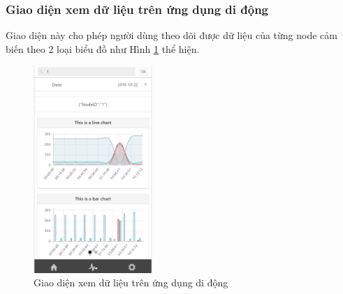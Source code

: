 \subsubsection*{Giao diện xem dữ liệu trên ứng dụng di động}
Giao diện này cho phép người dùng theo dõi được dữ liệu của từng node cảm biến theo 2 loại biểu đồ như Hình \ref{fig:app_graph} thể hiện.
\begin{center}
\begin{figure}[H]
\centering    
\includegraphics[width=0.4\textwidth]{app_graph}
\caption[Giao diện xem dữ liệu trên ứng dụng di động]{Giao diện xem dữ liệu trên ứng dụng di động}
\label{fig:app_graph}
\end{figure}
\end{center}


